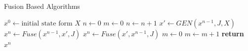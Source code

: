 \documentclass[10pt,twocolumn,letterpaper]{article}
\begin{document}
\begin{algorithm}
\begin{scriptsize}
\caption{Fusion Based Algorithms}\label{alg:fusion}
\begin{algorithmic}[1]
\State $x^0 \gets \textrm{initial state form } X$
\State $n \gets 0 $                                 
\State $m \gets 0 $                                 
\State $n \gets n+1$ 
 \State $x'\gets GEN(x^{n-1},J,X)$                    
   \State $x^{n} \gets Fuse(x^{n-1},x',J)$             
 \Else
   \State $x^{n} \gets Fuse(x',x^{n-1},J)$
 \EndIf
   \State $m \gets 0$                                 
 \Else
   \State $m \gets m+1$                               
 \EndIf
\EndWhile
\State \textbf{return} $x^n$
\EndProcedure
\end{algorithmic}
\end{scriptsize}
\end{algorithm}
\end{document}
